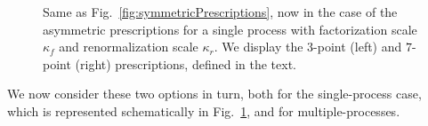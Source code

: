 \begin{figure}[t]
\centering
{}\qquad
{}
\begin{caption}{Same as Fig.~\ref{fig:symmetricPrescriptions},
    now in the case of the asymmetric prescriptions for a single process
    with factorization scale $\kappa_f$ and renormalization scale $\kappa_r$.
    We display the 
    $3$-point (left) and $7$-point (right) prescriptions, defined in the text.}
  \label{fig:AsymmetricPrescriptions1proc}
\end{caption}
\end{figure}

We now consider these two options in turn, both for the single-process
case, which is represented schematically
in Fig.~\ref{fig:AsymmetricPrescriptions1proc}, and for multiple-processes.

